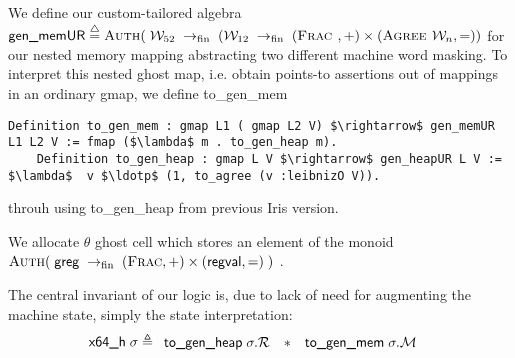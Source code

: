\begin{definition}
We define our custom-tailored algebra 
\newcommand\fpfn{\rightarrow_{\textrm{fin}}}
\( \textsf{gen\_memUR} \stackrel{\triangle}{=}
  \authm(\;
  \Locft \;\fpfn\;
  (\Loctw \;\fpfn\;  (\textsc{Frac }, \mathord{+}) \times (\textsc{Agree } \Loc,\mathord{=}) )
  \)
  for our nested memory mapping abstracting two different machine word masking. To interpret this nested ghost map, i.e. obtain points-to assertions out of mappings in an ordinary \textsf{gmap}, we define \textsf{to\_gen\_mem}
  \begin{lstlisting}[language=Coq]
    Definition to_gen_mem : gmap L1 ( gmap L2 V) $\rightarrow$ gen_memUR L1 L2 V := fmap ($\lambda$ m . to_gen_heap m).
    Definition to_gen_heap : gmap L V $\rightarrow$ gen_heapUR L V :=  $\lambda$  v $\ldotp$ (1, to_agree (v :leibnizO V)).
  \end{lstlisting}
 throuh using \textsf{to\_gen\_heap} from previous Iris version. 
\end{definition}

\begin{definition}
We allocate $\theta$ ghost cell which stores an
element of the monoid 
\newcommand\fpfn{\rightarrow_{\textrm{fin}}}
\(
  \authm(\;
    \regset \;\fpfn\;
    (\textsc{Frac}, \mathord{+})
    \times
    (\regvaltype, \mathord{=})
  \;)
\)
\cite[\S6.3.3]{iris}.
\end{definition}

\begin{definition}
\label{def:invariant}
The central invariant of our logic is, due to lack of need for augmenting the machine state, simply the state interpretation: 
\[
\textsf{x64\_h}\;\store \triangleq
\def\arraystretch{1.2}
\begin{array}{l@{\quad\ast\quad}l@{\quad}l}
  \textsf{to\_gen\_heap} \;\store.\mathcal{R} & \textsf{to\_gen\_mem} \; \store.\mathcal{M}
\end{array}
\]
\end{definition}

